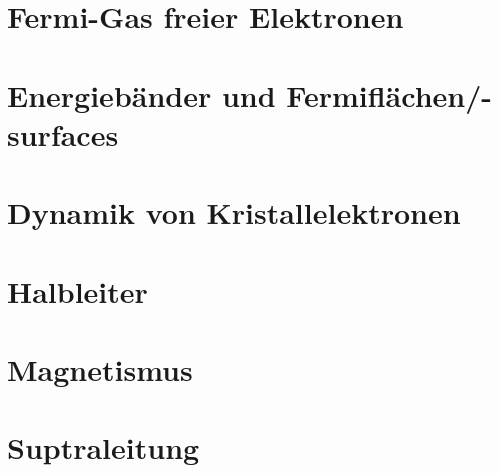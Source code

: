 \section{Fermi-Gas freier Elektronen}
\section{Energiebänder und Fermiflächen/-surfaces}
\section{Dynamik von Kristallelektronen}
\section{Halbleiter}
\section{Magnetismus}
\section{Suptraleitung}